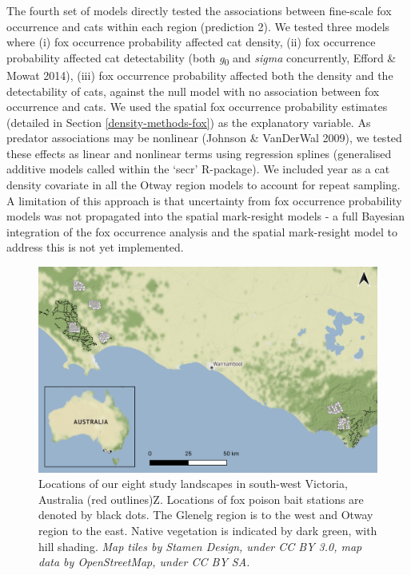 \documentclass[preprint, 3p, authoryear]{elsarticle} %
\begin{document}
The fourth set of models directly tested the associations between fine-scale fox occurrence and cats within each region (prediction 2). We tested three models where (i) fox occurrence probability affected cat density, (ii) fox occurrence probability affected cat detectability (both \emph{g}\textsubscript{0} and \emph{sigma} concurrently, Efford \& Mowat 2014), (iii) fox occurrence probability affected both the density and the detectability of cats, against the null model with no association between fox occurrence and cats. We used the spatial fox occurrence probability estimates (detailed in Section \ref{density-methods-fox}) as the explanatory variable. As predator associations may be nonlinear (Johnson \& VanDerWal 2009), we tested these effects as linear and nonlinear terms using regression splines (generalised additive models called within the `secr' R-package). We included year as a cat density covariate in all the Otway region models to account for repeat sampling. A limitation of this approach is that uncertainty from fox occurrence probability models was not propagated into the spatial mark-resight models - a full Bayesian integration of the fox occurrence analysis and the spatial mark-resight model to address this is not yet implemented.

\newpage

\begin{figure}

{\centering \includegraphics[width=1\linewidth]{../figs/fig1} 

}

\caption{Locations of our eight study landscapes in south-west Victoria, Australia (red outlines)Z. Locations of fox poison bait stations are denoted by black dots. The Glenelg region is to the west and Otway region to the east. Native vegetation is indicated by dark green, with hill shading. \textit{Map tiles by Stamen Design, under CC BY 3.0, map data by OpenStreetMap, under CC BY SA.}}\label{fig:density-map}
\end{figure}
\end{document}
